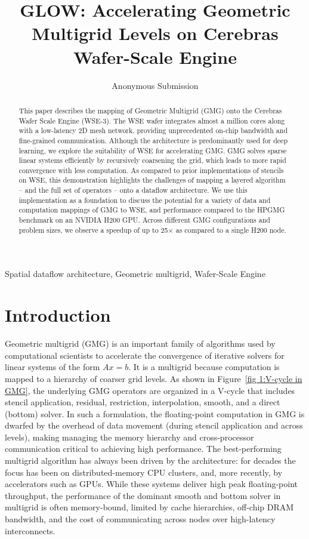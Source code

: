 \documentclass[conference]{IEEEtran}
\begin{document}
    \title{GLOW: Accelerating Geometric Multigrid Levels on Cerebras Wafer-Scale Engine}
    \author{Anonymous Submission}
    \maketitle
    \begin{abstract}
        This paper describes the mapping of Geometric Multigrid (GMG) onto the Cerebras Wafer Scale Engine (WSE-3).  The WSE wafer integrates almost a million cores along with a low-latency 2D mesh network, providing unprecedented on-chip bandwidth and fine-grained communication. Although the architecture is predominantly used for deep learning, we explore the suitability of WSE for accelerating GMG.
        GMG solves sparse linear systems efficiently by recursively coarsening the grid, which leads to more rapid convergence with less computation.
        As compared to prior implementations of stencils on WSE, this demonstration highlights the challenges of mapping a layered algorithm -- and the full set of operators -- onto a dataflow architecture.  We use this implementation as a foundation to discuss the potential for a variety of data and computation mappings of GMG to WSE, and performance compared to the HPGMG benchmark on an NVIDIA H200 GPU.  Across different GMG configurations and problem sizes, we observe a speedup of up to 25\(\times\) as compared to a single H200 node.
    \end{abstract}
    \begin{IEEEkeywords}
        Spatial dataflow architecture, Geometric multigrid, Wafer-Scale Engine
    \end{IEEEkeywords}
    \section{Introduction}
        Geometric multigrid (GMG) is an important family of algorithms used by computational scientists to accelerate the convergence of iterative solvers for linear systems of the form \(Ax=b\). It is a multigrid because computation is mapped to a hierarchy of coarser grid levels.  As shown in Figure~\ref{fig 1:V-cycle in GMG}, the underlying GMG operators are organized in a V-cycle that includes stencil application, residual, restriction, interpolation, smooth, and a direct (bottom) solver. In such a formulation, the floating-point computation in GMG is dwarfed by the overhead of data movement (during stencil application and across levels), making managing the memory hierarchy and cross-processor communication critical to achieving high performance. The best-performing multigrid algorithm has always been driven by the architecture: for decades the focus has been on distributed-memory CPU clusters, and, more recently, by accelerators such as GPUs. While these systems deliver high peak floating-point throughput, the performance of the dominant smooth and bottom solver in multigrid is often memory-bound, limited by cache hierarchies, off-chip DRAM bandwidth, and the cost of communicating across nodes over high-latency interconnects. 
\end{document}
